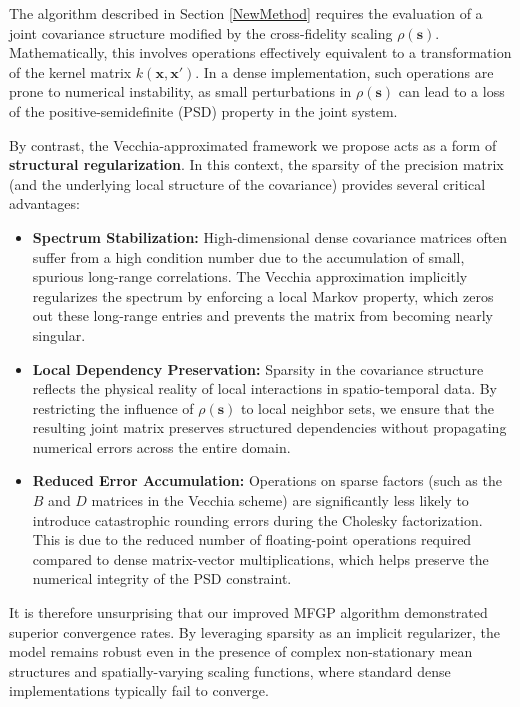 \documentclass[12pt]{article}
\begin{document}
The algorithm described in Section \ref{NewMethod} requires the evaluation of a joint covariance structure modified by the cross-fidelity scaling $\rho(\bm{s})$. Mathematically, this involves operations effectively equivalent to a transformation of the kernel matrix $k(\bm{x}, \bm{x}')$. In a dense implementation, such operations are prone to numerical instability, as small perturbations in $\rho(\bm{s})$ can lead to a loss of the positive-semidefinite (PSD) property in the joint system.

By contrast, the Vecchia-approximated framework we propose acts as a form of \textbf{structural regularization}. In this context, the sparsity of the precision matrix (and the underlying local structure of the covariance) provides several critical advantages:

\begin{itemize}
    \item \textbf{Spectrum Stabilization:} High-dimensional dense covariance matrices often suffer from a high condition number due to the accumulation of small, spurious long-range correlations. The Vecchia approximation implicitly regularizes the spectrum by enforcing a local Markov property, which zeros out these long-range entries and prevents the matrix from becoming nearly singular.
    
    \item \textbf{Local Dependency Preservation:} Sparsity in the covariance structure reflects the physical reality of local interactions in spatio-temporal data. By restricting the influence of $\rho(\bm{s})$ to local neighbor sets, we ensure that the resulting joint matrix preserves structured dependencies without propagating numerical errors across the entire domain.
    
    \item \textbf{Reduced Error Accumulation:} Operations on sparse factors (such as the $B$ and $D$ matrices in the Vecchia scheme) are significantly less likely to introduce catastrophic rounding errors during the Cholesky factorization. This is due to the reduced number of floating-point operations required compared to dense matrix-vector multiplications, which helps preserve the numerical integrity of the PSD constraint.
\end{itemize}



It is therefore unsurprising that our improved MFGP algorithm demonstrated superior convergence rates. By leveraging sparsity as an implicit regularizer, the model remains robust even in the presence of complex non-stationary mean structures and spatially-varying scaling functions, where standard dense implementations typically fail to converge.
\end{document}

